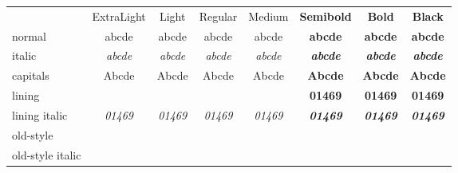 \documentclass[12pt]{standalone}
\newcommand*\spA{abcde}
\newcommand*\spB{01469}
\newcommand*\spr[1][\spA]{& #1 & #1 & #1 & #1 & #1 & #1 & #1 \\}
\begin{document}
\centering
\begin{tabular}{
		>{\sourcecodepro}l
		>{\sourcecodeproextreme}c
		>{\sourcecodeprolight}c
		>{\sourcecodepro}c
		>{\sourcecodepromedium}c
		>{\sourcecodeprolight\bfseries}c
		>{\sourcecodepro\bfseries}c
		>{\sourcecodeproextreme\bfseries}c }
	& ExtraLight & Light & Regular & Medium & Semibold & Bold & Black \\
	normal               \spr
	italic               \spr[\itshape\spA]
	capitals             \spr[\MakeUppercase\spA]
	lining               \spr[\spB]
	lining italic        \spr[\itshape\spB]
	old-style            \spr[\oldstylenums{\spB}]
	old-style italic     \spr[\oldstylenums{\itshape\spB}]
\end{tabular}
\end{document}
